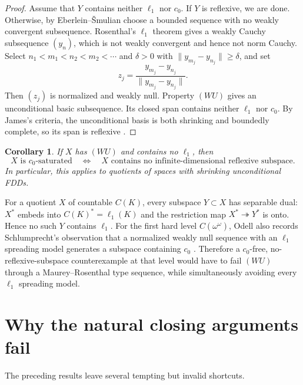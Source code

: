 \documentclass[11pt]{article}
\newtheorem{corollary}[theorem]{Corollary}
\theoremstyle{definition}
\newcommand{\onto}{\twoheadrightarrow}
\begin{document}
\begin{proof}
Assume that $Y$ contains neither $\ell_1$ nor $c_0$.  If $Y$ is reflexive,
we are done.  Otherwise, by Eberlein--\v{S}mulian choose a bounded sequence
with no weakly convergent subsequence.  Rosenthal's $\ell_1$ theorem gives a
weakly Cauchy subsequence $(y_n)$, which is not weakly convergent and hence
not norm Cauchy.  Select
$n_1<m_1<n_2<m_2<\cdots$ and $\delta>0$ with
$\|y_{m_j}-y_{n_j}\|\ge\delta$, and set
\[
   z_j=\frac{y_{m_j}-y_{n_j}}{\|y_{m_j}-y_{n_j}\|}.
\]
Then $(z_j)$ is normalized and weakly null.  Property $(WU)$ gives an
unconditional basic subsequence.  Its closed span contains neither $\ell_1$
nor $c_0$.  By James's criteria, the unconditional basis is both shrinking
and boundedly complete, so its span is reflexive
\cite{James1950,Rosenthal1974}.
\end{proof}

\begin{corollary}\label{cor:WU}
If $X$ has $(WU)$ and contains no $\ell_1$, then
\[
 X \text{ is }c_0\text{-saturated}
 \quad\Longleftrightarrow\quad
 X \text{ contains no infinite-dimensional reflexive subspace}.
\]
In particular, this applies to quotients of spaces with shrinking
unconditional FDDs.
\end{corollary}

For a quotient $X$ of countable $C(K)$, every subspace $Y\subset X$ has
separable dual: $X^*$ embeds into $C(K)^*=\ell_1(K)$ and the restriction
map $X^*\onto Y^*$ is onto.  Hence no such $Y$ contains $\ell_1$.  For the
first hard level $C(\omega^\omega)$, Odell also records Schlumprecht's
observation that a normalized weakly null sequence with an $\ell_1$
spreading model generates a subspace containing $c_0$
\cite[Section~3]{Odell1992}.  Therefore a $c_0$-free, no-reflexive-subspace
counterexample at that level would have to fail $(WU)$ through a
Maurey--Rosenthal type sequence, while simultaneously avoiding every
$\ell_1$ spreading model.

\section{Why the natural closing arguments fail}

The preceding results leave several tempting but invalid shortcuts.
\end{document}
